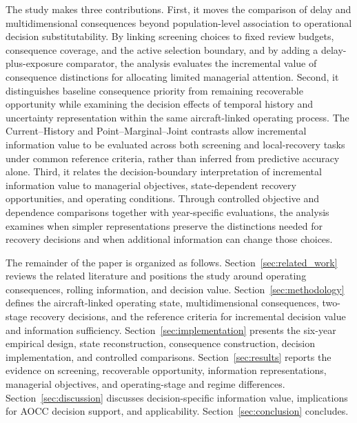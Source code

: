 The study makes three contributions. First, it moves the comparison of delay and multidimensional consequences beyond population-level association to operational decision substitutability. By linking screening choices to fixed review budgets, consequence coverage, and the active selection boundary, and by adding a delay-plus-exposure comparator, the analysis evaluates the incremental value of consequence distinctions for allocating limited managerial attention. Second, it distinguishes baseline consequence priority from remaining recoverable opportunity while examining the decision effects of temporal history and uncertainty representation within the same aircraft-linked operating process. The Current--History and Point--Marginal--Joint contrasts allow incremental information value to be evaluated across both screening and local-recovery tasks under common reference criteria, rather than inferred from predictive accuracy alone. Third, it relates the decision-boundary interpretation of incremental information value to managerial objectives, state-dependent recovery opportunities, and operating conditions. Through controlled objective and dependence comparisons together with year-specific evaluations, the analysis examines when simpler representations preserve the distinctions needed for recovery decisions and when additional information can change those choices.

The remainder of the paper is organized as follows. Section~\ref{sec:related_work} reviews the related literature and positions the study around operating consequences, rolling information, and decision value. Section~\ref{sec:methodology} defines the aircraft-linked operating state, multidimensional consequences, two-stage recovery decisions, and the reference criteria for incremental decision value and information sufficiency. Section~\ref{sec:implementation} presents the six-year empirical design, state reconstruction, consequence construction, decision implementation, and controlled comparisons. Section~\ref{sec:results} reports the evidence on screening, recoverable opportunity, information representations, managerial objectives, and operating-stage and regime differences. Section~\ref{sec:discussion} discusses decision-specific information value, implications for AOCC decision support, and applicability. Section~\ref{sec:conclusion} concludes.
